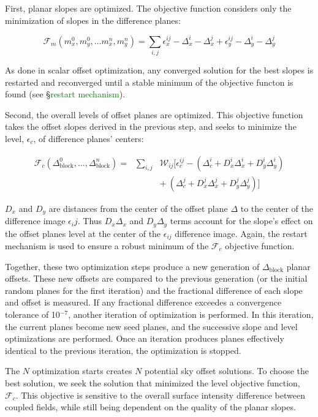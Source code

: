 \documentclass[iop]{emulateapj}
\newcommand{\todo}[1]{\textcolor{green}{#1}} %
\begin{document}
First, planar slopes are optimized. The objective function considers only the minimization of slopes in the difference planes:

\begin{equation}
	\mathcal{F}_m(m_x^0,m_y^0,\ldots m_x^n, m_y^n) = \sum_{i,j} \epsilon_x^{ij} - \Delta_x^i - \Delta_x^j + \epsilon_y^{ij} - \Delta_y^i - \Delta_y^j
\end{equation}

\noindent As done in scalar offset optimization, any converged solution for the best slopes is restarted and reconverged until a stable minimum of the objective functon is found (see \S \todo{restart mechanism}).

Second, the overall levels of offset planes are optimized. This objective function takes the offset slopes derived in the previous step, and seeks to minimize the level, $\epsilon_c$, of difference planes' centers:

\begin{eqnarray}\nonumber
	\mathcal{F}_c(\Delta_\mathrm{block}^0,\ldots,\Delta_\mathrm{block}^n) = &\sum_{i,j}& \mathcal{W}_{ij} [ \epsilon^{ij}_c - (\Delta_c^i + D_x^i\Delta_x^i + D_y^i\Delta_y^i) \\
	&& +~(\Delta_c^j + D_x^j\Delta_x^j + D_y^j\Delta_y^j) ]
\end{eqnarray}

$D_x$ and $D_y$ are distances from the center of the offset plane $\Delta$ to the center of the difference image $\epsilon_ij$. Thus $D_x\Delta_x$ and $D_y\Delta_y$ terms account for the slope's effect on the offset planes level at the center of the $\epsilon_{ij}$ difference image. Again, the restart mechanism is used to ensure a robust minimum of the $\mathcal{F}_c$ objective function.

Together, these two optimization steps produce a new generation of $\Delta_\mathrm{block}$ planar offsets. These new offsets are compared to the previous generation (or the initial random planes for the first iteration) and the fractional difference of each slope and offset is measured. If any fractional difference exceedes a convergence tolerance of 10$^{-7}$, another iteration of optimization is performed. In this iteration, the current planes become new seed planes, and the successive slope and level optimizations are performed. Once an iteration produces planes effectively identical to the previous iteration, the optimization is stopped.

The $N$ optimization starts creates $N$ potential sky offset solutions. To choose the best solution, we seek the solution that minimized the level objective function, $\mathcal{F}_c$. This objective is sensitive to the overall surface intensity difference between coupled fields, while still being dependent on the quality of the planar slopes.
\end{document}

